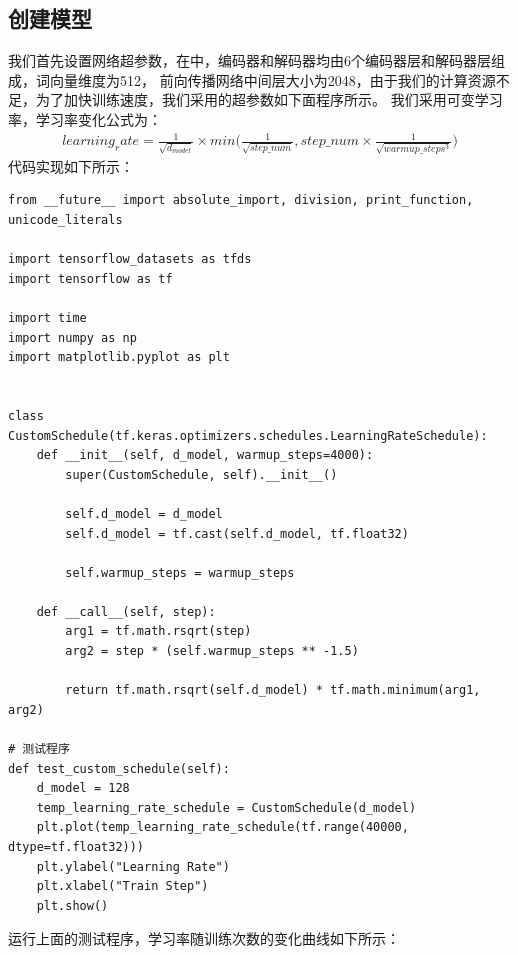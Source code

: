 \documentclass{article}
\begin{document}
\subsection{创建模型}
我们首先设置网络超参数，在\cite{r000006}中，编码器和解码器均由6个编码器层和解码器层组成，词向量维度为512，
前向传播网络中间层大小为2048，由于我们的计算资源不足，为了加快训练速度，我们采用的超参数如下面程序所示。\newline
我们采用可变学习率，学习率变化公式为：
\begin{equation}
\begin{aligned}
learning_rate = \frac{1}{\sqrt{d_{model}}} \times min\bigg( \frac{1}{\sqrt{step\_num}},
step\_num \times \frac{1}{\sqrt{warmup\_steps^{3}}} \bigg)
\end{aligned}
\label{e000119}
\end{equation}
代码实现如下所示：
\begin{lstlisting}
from __future__ import absolute_import, division, print_function, unicode_literals

import tensorflow_datasets as tfds
import tensorflow as tf

import time
import numpy as np
import matplotlib.pyplot as plt


class CustomSchedule(tf.keras.optimizers.schedules.LearningRateSchedule):
    def __init__(self, d_model, warmup_steps=4000):
        super(CustomSchedule, self).__init__()

        self.d_model = d_model
        self.d_model = tf.cast(self.d_model, tf.float32)

        self.warmup_steps = warmup_steps

    def __call__(self, step):
        arg1 = tf.math.rsqrt(step)
        arg2 = step * (self.warmup_steps ** -1.5)

        return tf.math.rsqrt(self.d_model) * tf.math.minimum(arg1, arg2)

# 测试程序
def test_custom_schedule(self):
    d_model = 128
    temp_learning_rate_schedule = CustomSchedule(d_model)
    plt.plot(temp_learning_rate_schedule(tf.range(40000, dtype=tf.float32)))
    plt.ylabel("Learning Rate")
    plt.xlabel("Train Step")
    plt.show()
\end{lstlisting}
运行上面的测试程序，学习率随训练次数的变化曲线如下所示：
\end{document}
